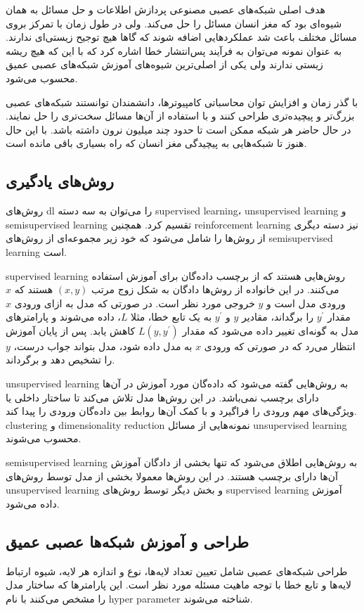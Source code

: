 هدف اصلی شبکه‌های عصبی مصنوعی پردازش اطلاعات و حل مسائل به همان شیوه‌ای بود که
مغز انسان مسائل را حل می‌کند. ولی در طول زمان با تمرکز بروی مسائل مختلف باعث شد
عملکردهایی اضافه شوند که گاها هیچ توجیح زیستی‌ای ندارند. به عنوان نمونه می‌توان
به فرآیند پس‌انتشار خطا اشاره کرد که با این که هیچ ریشه زیستی ندارند ولی یکی از
اصلی‌ترین شیوه‌های آموزش شبکه‌های عصبی عمیق محسوب می‌شود.

با گذر زمان و افزایش توان محاسباتی کامپیوترها، دانشمندان توانستند شبکه‌های عصبی
بزرگ‌تر و پیچیده‌تری طراحی کنند و با استفاده از آن‌ها مسائل سخت‌تری را حل
نمایند. در حال حاضر هر شبکه ممکن است تا حدود چند میلیون نرون داشته باشد. با این
حال هنوز تا شبکه‌هایی به پیچیدگی مغز انسان که راه بسیاری باقی مانده است.

\subsection{روش‌های یادگیری}
روش‌های \gls{dl} را می‌توان به سه دسته \gls{supervised learning}،
\gls{unsupervised learning} و \gls{semisupervised learning} تقسیم کرد. همچنین
\gls{reinforcement learning} نیز دسته دیگری از روش‌ها را شامل می‌شود که خود زیر مجموعه‌ای از
روش‌های \gls{semisupervised learning} است.

\gls{supervised learning} روش‌هایی هستند که از برچسب داده‌گان برای آموزش استفاده
می‌کنند. در این خانواده از روش‌ها دادگان به شکل زوج مرتب $(x, y)$ هستند که $x$
ورودی مدل است و $y$ خروجی مورد نظر است. در صورتی که مدل به ازای ورودی $x$ مقدار
$y^{\prime}$ را برگداند، مقادیر $y$ و $y^\prime$ به یک تابع خطا، مثلا $L$، داده
می‌شوند و پارامترهای مدل به گونه‌ای تغییر داده می‌شود که مقدار $L(y, y^\prime)$
کاهش یابد. پس از پایان آموزش انتظار می‌رد که در صورتی که ورودی $x$ به مدل داده
شود، مدل بتواند جواب درست، $y$ را تشخیص دهد و برگرداند.

\gls{unsupervised learning} به روش‌هایی گفته می‌شود که داده‌گان مورد آموزش در
آن‌ها دارای برچسب نمی‌باشد. در این روش‌ها مدل تلاش می‌کند تا ساختار داخلی یا
ویژگی‌های مهم ورودی را فراگیرد و با کمک آن‌ها روابط بین داده‌گان ورودی را
پیدا کند. \gls{clustering} و \gls{dimensionality reduction} نمونه‌هایی از مسائل
\gls{unsupervised learning} محسوب می‌شوند.

\gls{semisupervised learning} به روش‌هایی اطلاق می‌شود که تنها بخشی از دادگان
آموزش آن‌ها دارای برچسب هستند. در این روش‌ها معمولا بخشی از مدل توسط روش‌های
\gls{unsupervised learning} و بخش دیگر توسط روش‌های \gls{supervised learning}
آموزش داده می‌شود.

\subsection{طراحی و آموزش شبکه‌ها عصبی عمیق}
طراحی شبکه‌های عصبی شامل تعیین تعداد لایه‌ها، نوع و اندازه هر لایه، شیوه ارتباط
لایه‌ها و تابع خطا با توجه ماهیت مسئله مورد نظر است. این پارامترها که ساختار مدل
را مشخص می‌کنند با نام \gls{hyper parameter} شناخته می‌شوند.

